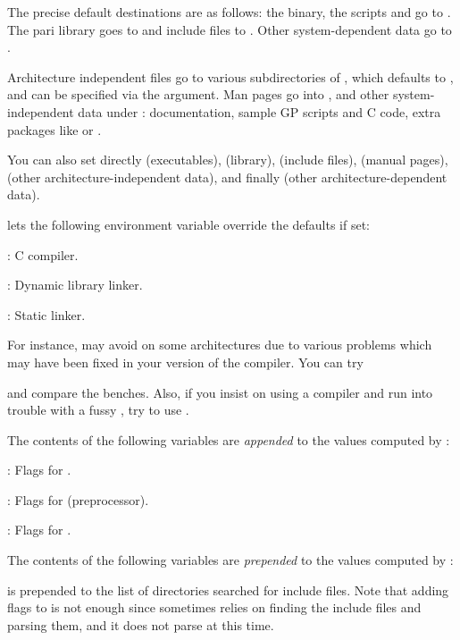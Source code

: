  The precise default destinations are as
follows: the  binary, the scripts  and  go
to . The pari library goes to  and
include files to . Other system-dependent data go
to .

Architecture independent files go to various subdirectories of
, which defaults to , and can be
specified via the  argument. Man pages go into
, and other system-independent data
under : documentation,
sample GP scripts and C code, extra packages like  or
.

\noindent You can also set directly  (executables),
 (library),  (include files), 
(manual pages),  (other architecture-independent data), and
finally  (other architecture-dependent data).

  lets the following environment
variable override the defaults if set:

: C compiler.

: Dynamic library linker.

: Static linker.

\noindent For instance,  may avoid  on some
architectures due to various problems which may have been fixed in your
version of the compiler. You can try


\noindent and compare the benches. Also, if you insist on using a 
compiler and run into trouble with a fussy , try to use
.


\noindent The contents of the following variables are \emph{appended} to the
values computed by :

: Flags for .

: Flags for  (preprocessor).

: Flags for .

\noindent The contents of the following variables are \emph{prepended} to
the values computed by :

 is prepended to the list of directories
searched for include files. Note that adding  flags to
 is not enough since  sometimes
relies on finding the include files and parsing them, and it does not
parse  at this time.

